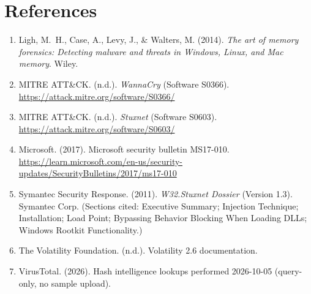 \documentclass[11pt,letterpaper]{article}
\begin{document}
\section*{References}
\begin{enumerate}[leftmargin=1.6em,itemsep=0.35em]
\item Ligh, M.~H., Case, A., Levy, J., \& Walters, M. (2014). \textit{The art of memory forensics: Detecting malware and threats in Windows, Linux, and Mac memory}. Wiley.
\item MITRE ATT\&CK. (n.d.). \textit{WannaCry} (Software S0366). \url{https://attack.mitre.org/software/S0366/}
\item MITRE ATT\&CK. (n.d.). \textit{Stuxnet} (Software S0603). \url{https://attack.mitre.org/software/S0603/}
\item Microsoft. (2017). Microsoft security bulletin MS17-010. \url{https://learn.microsoft.com/en-us/security-updates/SecurityBulletins/2017/ms17-010}
\item Symantec Security Response. (2011). \textit{W32.Stuxnet Dossier} (Version 1.3). Symantec Corp. (Sections cited: Executive Summary; Injection Technique; Installation; Load Point; Bypassing Behavior Blocking When Loading DLLs; Windows Rootkit Functionality.)
\item The Volatility Foundation. (n.d.). Volatility 2.6 documentation.
\item VirusTotal. (2026). Hash intelligence lookups performed 2026-10-05 (query-only, no sample upload).
\end{enumerate}
\end{document}

